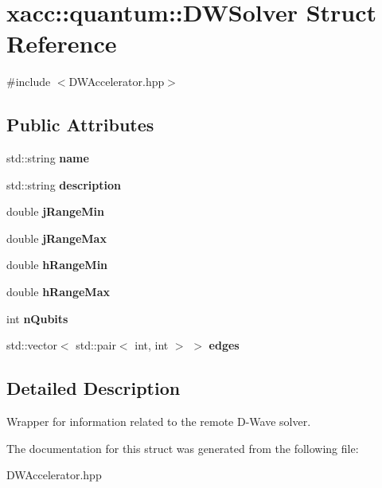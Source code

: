 \hypertarget{a00048}{}\section{xacc\+:\+:quantum\+:\+:D\+W\+Solver Struct Reference}
\label{a00048}


{\ttfamily \#include $<$D\+W\+Accelerator.\+hpp$>$}

\subsection*{Public Attributes}
\begin{DoxyCompactItemize}
\item 
std\+::string {\bfseries name}\hypertarget{a00048_a8a5b629dc83790a855d429c82266b772}{}\label{a00048_a8a5b629dc83790a855d429c82266b772}

\item 
std\+::string {\bfseries description}\hypertarget{a00048_a9bb9449a6ea09e11892f910a4bfd2e08}{}\label{a00048_a9bb9449a6ea09e11892f910a4bfd2e08}

\item 
double {\bfseries j\+Range\+Min}\hypertarget{a00048_a45fc23af53f44759afec0257d9878ba0}{}\label{a00048_a45fc23af53f44759afec0257d9878ba0}

\item 
double {\bfseries j\+Range\+Max}\hypertarget{a00048_aa881af1344ff55a4991c152f768ed9d6}{}\label{a00048_aa881af1344ff55a4991c152f768ed9d6}

\item 
double {\bfseries h\+Range\+Min}\hypertarget{a00048_abf475612dac8f64a7f88cfa976c393f0}{}\label{a00048_abf475612dac8f64a7f88cfa976c393f0}

\item 
double {\bfseries h\+Range\+Max}\hypertarget{a00048_a13dd875ceb06c7545fe20cde15ffac70}{}\label{a00048_a13dd875ceb06c7545fe20cde15ffac70}

\item 
int {\bfseries n\+Qubits}\hypertarget{a00048_a2908c913f5c5e3ade6551056aaadafbf}{}\label{a00048_a2908c913f5c5e3ade6551056aaadafbf}

\item 
std\+::vector$<$ std\+::pair$<$ int, int $>$ $>$ {\bfseries edges}\hypertarget{a00048_ae02cbfe68c982e50e80bcd2612c8c148}{}\label{a00048_ae02cbfe68c982e50e80bcd2612c8c148}

\end{DoxyCompactItemize}


\subsection{Detailed Description}
Wrapper for information related to the remote D-\/\+Wave solver. 

The documentation for this struct was generated from the following file\+:\begin{DoxyCompactItemize}
\item 
D\+W\+Accelerator.\+hpp\end{DoxyCompactItemize}
